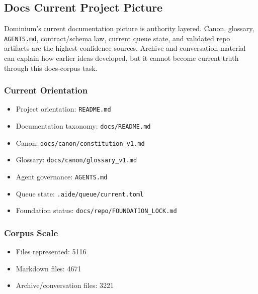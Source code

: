 \documentclass[9pt,a4paper,openany]{book}
\begin{document}
\subsection{Docs Current Project Picture}

Dominium's current documentation picture is authority layered.\allowbreak{} Canon, glossary, \texttt{AGENTS.\allowbreak{}md}, contract/\allowbreak{}schema law, current queue state, and validated repo artifacts are the highest-\allowbreak{}confidence sources.\allowbreak{} Archive and conversation material can explain how earlier ideas developed, but it cannot become current truth through this docs-\allowbreak{}corpus task.\allowbreak{}


\subsubsection{Current Orientation}

\begin{itemize}
\item Project orientation: \texttt{README.\allowbreak{}md}
\item Documentation taxonomy: \texttt{docs/\allowbreak{}README.\allowbreak{}md}
\item Canon: \texttt{docs/\allowbreak{}canon/\allowbreak{}constitution\_\allowbreak{}v1.\allowbreak{}md}
\item Glossary: \texttt{docs/\allowbreak{}canon/\allowbreak{}glossary\_\allowbreak{}v1.\allowbreak{}md}
\item Agent governance: \texttt{AGENTS.\allowbreak{}md}
\item Queue state: \texttt{.\allowbreak{}aide/\allowbreak{}queue/\allowbreak{}current.\allowbreak{}toml}
\item Foundation status: \texttt{docs/\allowbreak{}repo/\allowbreak{}FOUNDATION\_\allowbreak{}LOCK.\allowbreak{}md}
\end{itemize}

\subsubsection{Corpus Scale}

\begin{itemize}
\item Files represented: 5116
\item Markdown files: 4671
\item Archive/\allowbreak{}conversation files: 3221
\end{itemize}
\end{document}
